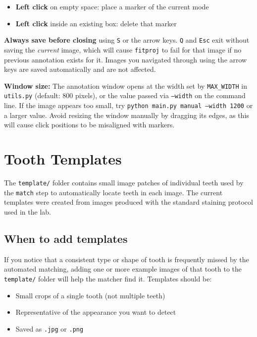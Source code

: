 \documentclass[11pt, letterpaper]{article}
\begin{document}
\begin{itemize}[leftmargin=*]
  \item \textbf{Left click} on empty space: place a marker of the current mode
  \item \textbf{Left click} inside an existing box: delete that marker
\end{itemize}

\begin{warnbox}
\textbf{Always save before closing} using \texttt{S} or the arrow keys. \texttt{Q} and
\texttt{Esc} exit without saving the \emph{current} image, which will cause \texttt{fitproj}
to fail for that image if no previous annotation exists for it. Images you navigated
through using the arrow keys are saved automatically and are not affected.
\end{warnbox}

\begin{tipbox}
\textbf{Window size:} The annotation window opens at the width set by \texttt{MAX\_WIDTH}
in \texttt{utils.py} (default: 800 pixels), or the value passed via \texttt{--width} on
the command line. If the image appears too small, try \texttt{python main.py manual --width 1200}
or a larger value. Avoid resizing the window manually by dragging its edges, as this will
cause click positions to be misaligned with markers.
\end{tipbox}

\section{Tooth Templates}

The \texttt{template/} folder contains small image patches of individual teeth used
by the \texttt{match} step to automatically locate teeth in each image. The current
templates were created from images produced with the standard staining protocol used
in the lab.

\subsection*{When to add templates}

If you notice that a consistent type or shape of tooth is frequently missed by the
automated matching, adding one or more example images of that tooth to the
\texttt{template/} folder will help the matcher find it. Templates should be:

\begin{itemize}[leftmargin=*]
  \item Small crops of a single tooth (not multiple teeth)
  \item Representative of the appearance you want to detect
  \item Saved as \texttt{.jpg} or \texttt{.png}
\end{itemize}
\end{document}
